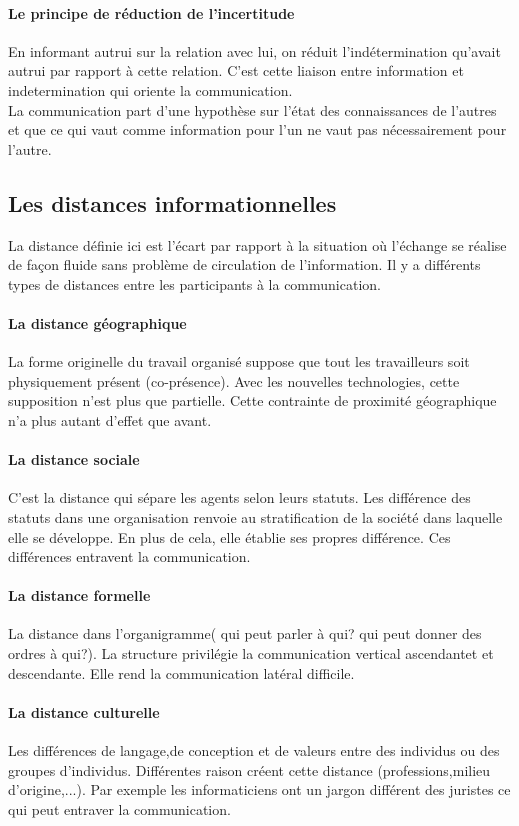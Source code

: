 \documentclass[11pt]{article} %
\begin{document}
		\paragraph{Le principe de réduction de l'incertitude} En informant autrui sur la relation avec lui, on 
		réduit l'indétermination qu'avait autrui par rapport à cette relation. C'est cette liaison entre information 
		et indetermination qui oriente la communication.\\
		La communication part d'une hypothèse sur l'état des connaissances de l'autres et que ce qui vaut 
		comme information pour l'un ne vaut pas nécessairement pour l'autre.

	\subsection{Les distances informationnelles}
		La distance définie ici est l'écart par rapport à la situation où l'échange se réalise de façon fluide
		sans problème de circulation de l'information. Il y a différents types de distances entre les participants 
		à la communication. 
		\paragraph{La distance géographique} La forme originelle du travail organisé suppose que tout les 
		travailleurs soit physiquement présent (co-présence). Avec les nouvelles technologies, cette supposition 
		n'est plus que partielle. Cette contrainte de proximité géographique n'a plus autant d'effet que avant.
		\paragraph{La distance sociale} C'est la distance qui sépare les agents selon leurs statuts. Les 
		différence des statuts dans une organisation renvoie au stratification de la société dans laquelle elle se 
		développe. En plus de cela, elle établie ses propres différence. Ces différences entravent la 
		communication.
		\paragraph{La distance formelle} La distance dans l'organigramme( qui peut parler à qui? qui peut 
		donner des ordres à qui?). La structure privilégie la communication vertical ascendantet et 
		descendante. Elle rend la communication latéral difficile.
		\paragraph{La distance culturelle} Les différences de langage,de conception et de valeurs entre des 	
		individus ou des groupes d'individus. Différentes raison créent cette distance (professions,milieu 
		d'origine,...). Par exemple les informaticiens ont un jargon différent des juristes ce qui peut entraver la 
		communication.
\end{document}

